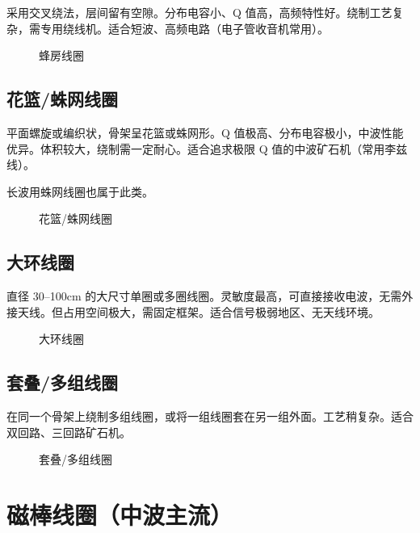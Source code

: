 \documentclass[12pt,UTF8]{ctexbook}
\begin{document}
采用交叉绕法，层间留有空隙。分布电容小、Q 值高，高频特性好。绕制工艺复杂，需专用绕线机。适合短波、高频电路（电子管收音机常用）。

\begin{figure}[H]
	\centering
	\caption{蜂房线圈}
	\label{fig:honeycomb-coil}
\end{figure}

\subsection{花篮/蛛网线圈}

平面螺旋或编织状，骨架呈花篮或蛛网形。Q 值极高、分布电容极小，中波性能优异。体积较大，绕制需一定耐心。适合追求极限 Q 值的中波矿石机（常用李兹线）。

长波用蛛网线圈也属于此类。

\begin{figure}[H]
	\centering
	\caption{花篮/蛛网线圈}
	\label{fig:spider-coil}
\end{figure}

\subsection{大环线圈}

直径 30–100cm 的大尺寸单圈或多圈线圈。灵敏度最高，可直接接收电波，无需外接天线。但占用空间极大，需固定框架。适合信号极弱地区、无天线环境。

\begin{figure}[H]
	\centering
	\caption{大环线圈}
	\label{fig:large-loop-coil}
\end{figure}

\subsection{套叠/多组线圈}

在同一个骨架上绕制多组线圈，或将一组线圈套在另一组外面。工艺稍复杂。适合双回路、三回路矿石机。

\begin{figure}[H]
	\centering
	\caption{套叠/多组线圈}
	\label{fig:stacked-coils}
\end{figure}


\section{磁棒线圈（中波主流）}
\end{document}
